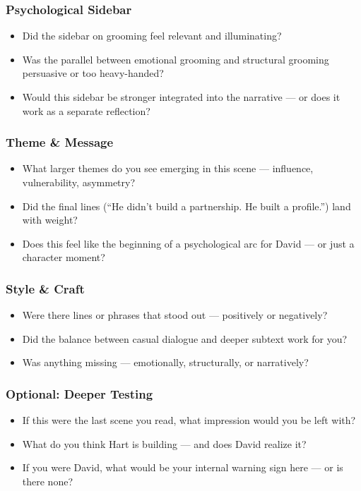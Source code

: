 \subsubsection{Psychological Sidebar}

\begin{itemize}
  \item Did the sidebar on grooming feel relevant and illuminating?
  \item Was the parallel between emotional grooming and structural grooming persuasive or too heavy-handed?
  \item Would this sidebar be stronger integrated into the narrative — or does it work as a separate reflection?
\end{itemize}

\subsubsection{Theme \& Message}

\begin{itemize}
  \item What larger themes do you see emerging in this scene — influence, vulnerability, asymmetry?
  \item Did the final lines (“He didn’t build a partnership. He built a profile.”) land with weight?
  \item Does this feel like the beginning of a psychological arc for David — or just a character moment?
\end{itemize}

\subsubsection{Style \& Craft}

\begin{itemize}
  \item Were there lines or phrases that stood out — positively or negatively?
  \item Did the balance between casual dialogue and deeper subtext work for you?
  \item Was anything missing — emotionally, structurally, or narratively?
\end{itemize}

\subsubsection{Optional: Deeper Testing}

\begin{itemize}
  \item If this were the last scene you read, what impression would you be left with?
  \item What do you think Hart is building — and does David realize it?
  \item If you were David, what would be your internal warning sign here — or is there none?
\end{itemize}






